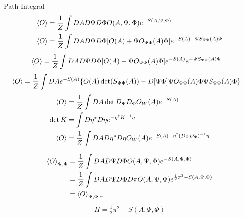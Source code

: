 \documentclass[10pt]{beamer}
\begin{document}
  \begin{frame}{Path Integral}
    \begin{align*}
        \braket{O} &= \frac{1}{Z}\int DA D\Psi D\Phi O(A,\Psi,\Phi)e^{-S(A,\Psi,\Phi)}\\
        \braket{O} &= \frac{1}{Z}\int DA D\Psi D\Phi [O(A) + \Psi O_{\Psi\Phi}(A)\Phi]e^{-S(A) - \Psi S_{\Psi\Phi}(A)\Phi}
    \end{align*}
    \begin{align*}
        \braket{O} &= \frac{1}{Z}\int DA D\Psi D\Phi [O(A) + \Psi O_{\Psi\Phi}(A)\Phi]e^{-S(A)} e^{- \Psi S_{\Psi\Phi}(A)\Phi}
    \end{align*}
    \begin{align*}
    \braket{O} &= \frac{1}{Z}\int DA e^{-S(A)}   \{ O(A)\det(S_{\Psi\Phi}(A)) -D[\Psi\Phi] \Psi O_{\Psi\Phi}(A)\Phi\Psi S_{\Psi\Phi}(A)\Phi\}
    \end{align*}
    \begin{align}\label{eqn:lecturenote}
        \braket{O} &= \frac{1}{Z}\int DA \det D_{\Psi}D_{\Phi} O_W(A)  e^{-S(A)} \\
        \det K &= \int D\eta^* D\eta e^{-\eta^\dagger K^{-1}\eta} \nonumber \\
        \braket{O} &= \frac{1}{Z}\int DA D\eta^*D\eta O_W(A)  e^{-S(A) - \eta^\dagger (D_{\Psi}D_{\Phi})^{-1} \eta} 
    \end{align}
  \end{frame}

  \begin{frame}
    \begin{align}
        \braket{O}_{\Psi,\Phi} &= \frac{1}{Z}\int DA D\Psi D\Phi O(A,\Psi,\Phi)e^{-S(A,\Psi,\Phi)}\nonumber\\ 
        &= \frac{1}{Z}\int DA D\Psi D\Phi D\pi O(A,\Psi,\Phi)e^{\frac{1}{2}\pi^2 -S(A,\Psi,\Phi)}\nonumber\\
        &= \braket{O}_{\Psi,\Phi,\pi}
    \end{align}
     \begin{align}
        H = \frac{1}{2}\pi^2 -S(A,\Psi,\Phi)
    \end{align}
 \end{frame}
 
\end{document}
